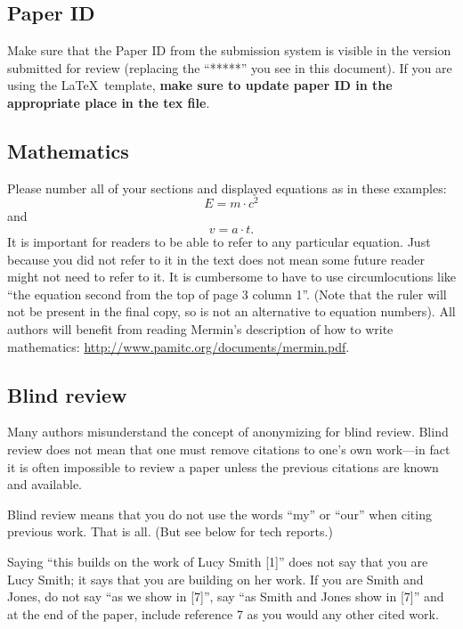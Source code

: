 \documentclass[10pt,twocolumn,letterpaper]{article}
\begin{document}
\subsection{Paper ID}
Make sure that the Paper ID from the submission system is visible in the version submitted for review (replacing the ``*****'' you see in this document).
If you are using the \LaTeX\ template, \textbf{make sure to update paper ID in the appropriate place in the tex file}.


\subsection{Mathematics}

Please number all of your sections and displayed equations as in these examples:
\begin{equation}
  E = m\cdot c^2
  \label{eq:important}
\end{equation}
and
\begin{equation}
  v = a\cdot t.
  \label{eq:also-important}
\end{equation}
It is important for readers to be able to refer to any particular equation.
Just because you did not refer to it in the text does not mean some future reader might not need to refer to it.
It is cumbersome to have to use circumlocutions like ``the equation second from the top of page 3 column 1''.
(Note that the ruler will not be present in the final copy, so is not an alternative to equation numbers).
All authors will benefit from reading Mermin's description of how to write mathematics:
\url{http://www.pamitc.org/documents/mermin.pdf}.

\subsection{Blind review}

Many authors misunderstand the concept of anonymizing for blind review.
Blind review does not mean that one must remove citations to one's own work---in fact it is often impossible to review a paper unless the previous citations are known and available.

Blind review means that you do not use the words ``my'' or ``our'' when citing previous work.
That is all.
(But see below for tech reports.)

Saying ``this builds on the work of Lucy Smith [1]'' does not say that you are Lucy Smith;
it says that you are building on her work.
If you are Smith and Jones, do not say ``as we show in [7]'', say ``as Smith and Jones show in [7]'' and at the end of the paper, include reference 7 as you would any other cited work.
\end{document}
